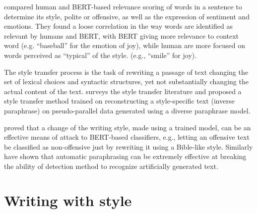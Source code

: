 \documentclass[
twocolumn,
]{ceurart}
\begin{document}
\citet{hayati2021does} compared human and BERT-based relevance scoring of words in a sentence to determine its style, polite or offensive, as well as the expression of sentiment and emotions.
They found a loose correlation in the way words are identified as relevant by humans and BERT, with BERT giving more relevance to context word (e.g. ``baseball'' for the emotion of joy), while human are more focused on words perceived as ``typical'' of the style. (e.g., ``smile'' for joy).

The style transfer process is the task of rewriting a passage of text changing the set of lexical choices and syntactic structures, yet not substantially changing the actual content of the text.
\citet{krishna-etal-2020-reformulating} surveys the style transfer literature and proposed a style transfer method trained on reconstructing a style-specific text (inverse paraphrase) on pseudo-parallel data generated using a diverse paraphrase model.

\citet{qi-etal-2021-mind} proved that a change of the writing style, made using a trained model, can be an effective means of attack to BERT-based classifiers, e.g., letting an offensive text be classified as non-offensive just by rewriting it using a Bible-like style.
Similarly \citet{krishna23} have shown that automatic paraphrasing can be extremely effective at breaking the ability of detection method to recognize artificially generated text.


\section{Writing with style}
\label{sec:queneau}
\end{document}
